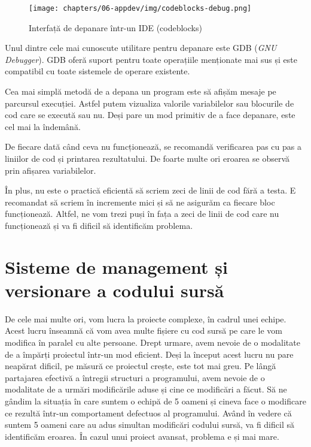 \begin{figure}[!htbp]
  \centering
  \texttt{[image: chapters/06-appdev/img/codeblocks-debug.png]}
  \caption{Interfață de depanare într-un IDE (codeblocks)}
  \label{fig:appdev:ide-debug}
\end{figure}

Unul dintre cele mai cunoscute utilitare pentru depanare este GDB  (\textit{GNU Debugger}). GDB oferă suport pentru
toate operațiile menționate mai sus și este compatibil cu toate sistemele de
operare existente.

Cea mai simplă metodă de a depana un program este să afișăm mesaje pe parcursul
execuției. Astfel putem vizualiza valorile variabilelor sau blocurile de cod
care se execută sau nu. Deși pare un mod primitiv de a face depanare, este cel
mai la îndemână.

De fiecare dată când ceva nu funcționează, se recomandă verificarea pas cu pas a
liniilor de cod și printarea rezultatului. De foarte multe ori eroarea se
observă prin afișarea variabilelor.

În plus, nu este o practică eficientă să scriem zeci de linii de cod fără a
testa. E recomandat să scriem în incremente mici și să ne asigurăm ca fiecare
bloc funcționează. Altfel, ne vom trezi puși în fața a zeci de linii de cod care
nu funcționează și va fi dificil să identificăm problema.

\section{Sisteme de management și versionare a codului sursă}
\label{sec:appdev-versioning}

De cele mai multe ori, vom lucra la proiecte complexe, în cadrul unei echipe.
Acest lucru înseamnă că vom avea multe fișiere cu cod sursă pe care le vom modifica în
paralel cu alte persoane. Drept urmare, avem nevoie de o modalitate de a împărți
proiectul într-un mod eficient. Deși la început acest lucru nu pare neapărat
dificil, pe măsură ce proiectul crește, este tot mai greu. Pe lângă partajarea
efectivă a întregii structuri a programului, avem nevoie de o modalitate de a
urmări modificările aduse și cine ce modificări a făcut. Să ne gândim la
situația în care suntem o echipă de 5 oameni și cineva face o modificare ce
rezultă într-un comportament defectuos al programului. Având în vedere că suntem
5 oameni care au adus simultan modificări codului sursă, va fi dificil să
identificăm eroarea. În cazul unui proiect avansat, problema e și mai mare.

